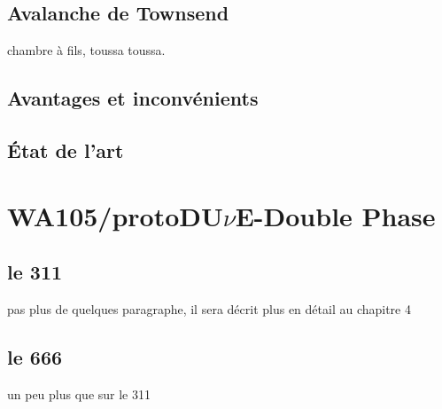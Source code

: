     \subsection{Avalanche de Townsend}\label{sec::townsend}
      chambre à fils, toussa toussa.
    \subsection{Avantages et inconvénients}
    \subsection{État de l'art}
    
  \section{WA105/\texorpdfstring{protoDU$\nu$E}{protoDUNE}-Double Phase}
    \subsection{le 311}
        pas plus de quelques paragraphe, il sera décrit plus en détail au chapitre 4
    \subsection{le 666}
        un peu plus que sur le 311
\printbibliography